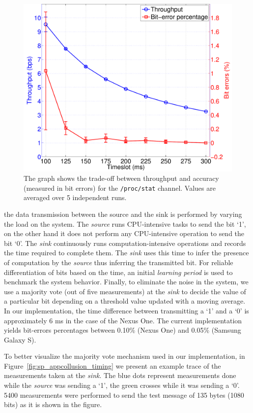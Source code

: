 \begin{figure}[!ht]
	\centering
	\includegraphics[width=.8\linewidth]{figures/securingphone/channels_p2}
	\caption[Trade-off between throughput and accuracy]{The graph shows the trade-off
between throughput and accuracy (measured in bit errors) for the \texttt{/proc/stat}
channel. Values are averaged over 5 independent runs.}
	\label{fig:sp_appcollusion_procstatb}
\end{figure}

 the data transmission between the
source and the sink is performed by varying the load on the
system. The \emph{source} runs CPU-intensive tasks to send the bit
`1', on the other hand it does not perform any CPU-intensive operation
to send the bit `0'. The \emph{sink} continuously runs
computation-intensive operations and records the time required to
complete them. The \emph{sink} uses this time to infer the presence of
computation by the \emph{source} thus inferring the transmitted
bit. For reliable differentiation of bits based on the time, an
initial \emph{learning period} is used to benchmark the system
behavior. Finally, to eliminate the noise in the system, we use a
majority vote (out of five measurements) at the \emph{sink} to decide
the value of a particular bit depending on a threshold value updated
with a moving average. In our implementation, the time difference
between transmitting a `1' and a `0' is approximately 6 ms in the case
of the Nexus One. The current implementation yields bit-errors
percentages between 0.10\% (Nexus One) and 0.05\% (Samsung Galaxy S).

To better visualize the majority vote mechanism used in our
implementation, in Figure~\ref{fig:sp_appcollusion_timing} we present an example
trace of the measurements taken at the \emph{sink}. The blue dots
represent measurements done while the \emph{source} was sending a
`1', the green crosses while it was sending a `0'. 5400 measurements
were performed to send the test message of 135 bytes (1080 bits) as
it is shown in the figure.

